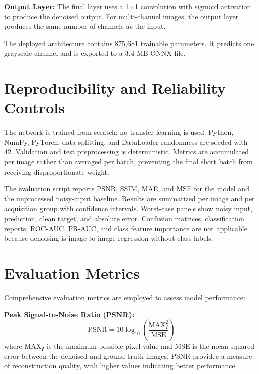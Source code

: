 \documentclass[12pt,a4paper]{report}
\begin{document}
\vspace{0.5cm}

\textbf{Output Layer:} The final layer uses a 1×1 convolution with sigmoid activation to produce the denoised output. For multi-channel images, the output layer produces the same number of channels as the input.

\vspace{0.5cm}

The deployed architecture contains 875,681 trainable parameters. It predicts one grayscale channel and is exported to a 3.4 MB ONNX file.

\section{Reproducibility and Reliability Controls}

The network is trained from scratch; no transfer learning is used. Python, NumPy, PyTorch, data splitting, and DataLoader randomness are seeded with 42. Validation and test preprocessing is deterministic. Metrics are accumulated per image rather than averaged per batch, preventing the final short batch from receiving disproportionate weight.

The evaluation script reports PSNR, SSIM, MAE, and MSE for the model and the unprocessed noisy-input baseline. Results are summarized per image and per acquisition group with confidence intervals. Worst-case panels show noisy input, prediction, clean target, and absolute error. Confusion matrices, classification reports, ROC-AUC, PR-AUC, and class feature importance are not applicable because denoising is image-to-image regression without class labels.

\section{Evaluation Metrics}

Comprehensive evaluation metrics are employed to assess model performance:

\vspace{0.5cm}

\textbf{Peak Signal-to-Noise Ratio (PSNR):}
\begin{equation}
\text{PSNR} = 10 \log_{10}\left(\frac{\text{MAX}_I^2}{\text{MSE}}\right)
\end{equation}
where $\text{MAX}_I$ is the maximum possible pixel value and MSE is the mean squared error between the denoised and ground truth images. PSNR provides a measure of reconstruction quality, with higher values indicating better performance.
\end{document}
